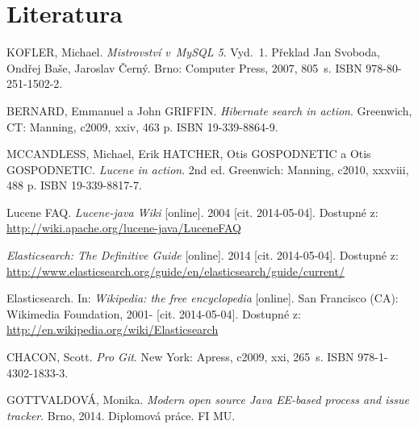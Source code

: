 \documentclass[11pt,oneside]{fithesis2}
\begin{document}
\printindex

\begingroup
\def\tmpchapter{0}
\renewcommand{\chaptername}{}
\renewcommand{\thechapter}{}
\chapter{Literatura}
\renewcommand{\chapter}[2]{}%

\begin{thebibliography}{1}

KOFLER, Michael. \textit{Mistrovství v~MySQL 5}. Vyd.~1. Překlad Jan Svoboda, Ondřej Baše, Jaroslav Černý. Brno: Computer Press, 2007, 805~s. ISBN 978-80-251-1502-2. 

BERNARD, Emmanuel a John GRIFFIN. \textit{Hibernate search in action}. Greenwich, CT: Manning, c2009, xxiv, 463 p. ISBN 19-339-8864-9. 

MCCANDLESS, Michael, Erik HATCHER, Otis GOSPODNETIC a Otis GOSPODNETIC. \textit{Lucene in action}. 2nd ed. Greenwich: Manning, c2010, xxxviii, 488 p. ISBN 19-339-8817-7. 

Lucene FAQ. \textit{Lucene-java Wiki} [online]. 2004 [cit. 2014-05-04]. Dostupné z: \url{http://wiki.apache.org/lucene-java/LuceneFAQ}

\textit{Elasticsearch: The Definitive Guide} [online]. 2014 [cit. 2014-05-04]. Dostupné z: \url{http://www.elasticsearch.org/guide/en/elasticsearch/guide/current/}

Elasticsearch. In: \textit{Wikipedia: the free encyclopedia} [online]. San Francisco (CA): Wikimedia Foundation, 2001- [cit. 2014-05-04]. Dostupné z: \url{http://en.wikipedia.org/wiki/Elasticsearch}

CHACON, Scott. \textit{Pro Git}. New York: Apress, c2009, xxi, 265~s. ISBN 978-1-4302-1833-3. 

GOTTVALDOVÁ, Monika. \textit{Modern open source Java EE-based process and issue tracker}. Brno, 2014. Diplomová práce. FI MU.


\end{thebibliography}

\endgroup

\appendix

\end{document}
